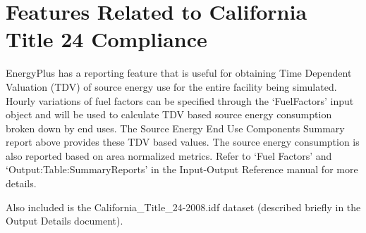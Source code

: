 \section{Features Related to California Title 24 Compliance}\label{features-related-to-california-title-24-compliance}

EnergyPlus has a reporting feature that is useful for obtaining Time Dependent Valuation (TDV) of source energy use for the entire facility being simulated. Hourly variations of fuel factors can be specified through the `FuelFactors' input object and will be used to calculate TDV based source energy consumption broken down by end uses. The Source Energy End Use Components Summary report above provides these TDV based values. The source energy consumption is also reported based on area normalized metrics. Refer to `Fuel Factors' and `Output:Table:SummaryReports' in the Input-Output Reference manual for more details.

Also included is the California\_Title\_24-2008.idf dataset (described briefly in the Output Details document).
